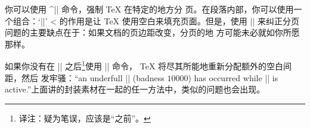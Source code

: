 
你可以使用 ^|\eject| 命令\ctsref{\eject}，强制 \TeX{} 在特定的地方分
页。在段落内部，你可以使用一个组合：`|\vadjust{\vfill\eject}|'
\ctsref{\vadjust}
^^| 的作用是让 \TeX{} 使用空白来填充页面。但是，使用
|\eject| 来纠正分页问题的主要缺点在于：如果文档的页边距改变，分页的地
方可能未必就如你所愿那样。


如果你没有在 |\eject| 之后\footnote{译注：疑为笔误，应该是“之前”。}使用 |\vfill| 命令，
\TeX{} 将尽其所能地重新分配额外的空白间距，然后
发牢骚：“an underfull |\vbox| (badness $10000$) has occurred while |\output| is
 active.”上面讲的封装素材在一起的任一方法中，类似的问题也会出现。


